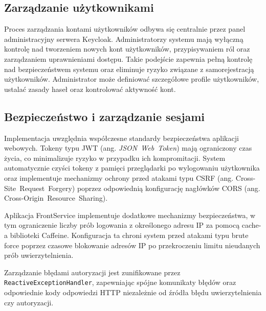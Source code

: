 \subsection{Zarządzanie użytkownikami}

Proces zarządzania kontami użytkowników odbywa się centralnie przez panel administracyjny serwera Keycloak. Administratorzy systemu mają wyłączną kontrolę nad tworzeniem nowych kont użytkowników, przypisywaniem ról oraz zarządzaniem uprawnieniami dostępu. Takie podejście zapewnia pełną kontrolę nad bezpieczeństwem systemu oraz eliminuje ryzyko związane z samorejestracją użytkowników. Administrator może definiować szczegółowe profile użytkowników, ustalać zasady haseł oraz kontrolować aktywność kont. 

\subsection{Bezpieczeństwo i zarządzanie sesjami}

Implementacja uwzględnia współczesne standardy bezpieczeństwa aplikacji webowych. Tokeny typu JWT (ang. \textit{\mbox{JSON Web Token}}) mają ograniczony czas życia, co minimalizuje ryzyko w przypadku ich kompromitacji. System automatycznie czyści tokeny z pamięci przeglądarki po wylogowaniu użytkownika oraz implementuje mechanizmy ochrony przed atakami typu CSRF (ang. \mbox{Cross-Site Request Forgery}) poprzez odpowiednią konfigurację nagłówków CORS (ang. \mbox{Cross-Origin Resource Sharing}).

Aplikacja FrontService implementuje dodatkowe mechanizmy bezpieczeństwa, w tym ograniczenie liczby prób logowania z określonego adresu IP za pomocą cache-a biblioteki Caffeine. Konfiguracja ta chroni system przed atakami typu brute force poprzez czasowe blokowanie adresów IP po przekroczeniu limitu nieudanych prób uwierzytelnienia.

Zarządzanie błędami autoryzacji jest zunifikowane przez \texttt{ReactiveExceptionHandler}, zapewniając spójne komunikaty błędów oraz odpowiednie kody odpowiedzi HTTP niezależnie od źródła błędu uwierzytelnienia czy autoryzacji.